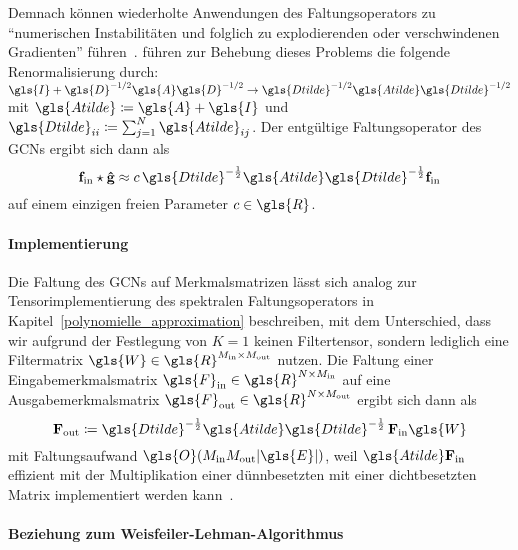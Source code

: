 Demnach können wiederholte Anwendungen des Faltungsoperators zu \enquote{numerischen Instabilitäten und folglich zu explodierenden oder verschwindenen Gradienten} führen~\cite{gcn}.
\citeauthor{gcn} führen zur Behebung dieses Problems die folgende Renormalisierung durch: $\gls{I} + \gls{D}^{-1/2} \gls{A} \gls{D}^{-1/2} \rightarrow \gls{Dtilde}^{-1/2} \gls{Atilde} \gls{Dtilde}^{-1/2}$ mit $\gls{Atilde} \coloneqq \gls{A} + \gls{I}$ und $\gls{Dtilde}_{ii} \coloneqq \sum_{j=1}^N \gls{Atilde}_{ij}$.
Der entgültige Faltungsoperator des \glspl{GCN} ergibt sich dann als
\begin{equation}
  \ve{f}_{\mathrm{in}} \star \ve{\hat g} \approx c\, \gls{Dtilde}^{-\frac{1}{2}} \gls{Atilde} \gls{Dtilde}^{-\frac{1}{2}} \ve{f}_{\mathrm{in}}
  \label{eq:gcn_renorm}
\end{equation}
auf einem einzigen freien Parameter $c \in \gls{R}$.

\paragraph{Implementierung}
\label{gcn_tensor}

Die Faltung des \glspl{GCN} auf Merkmalsmatrizen lässt sich analog zur Tensorimplementierung des spektralen Faltungsoperators in Kapitel~\ref{polynomielle_approximation} beschreiben, mit dem Unterschied, dass wir aufgrund der Festlegung von $K=1$ keinen Filtertensor, sondern lediglich eine Filtermatrix $\gls{W} \in \gls{R}^{M_{\mathrm{in}} \times M_{\mathrm{out}}}$ nutzen.
Die Faltung einer Eingabemerkmalsmatrix $\gls{F}_{\mathrm{in}} \in \gls{R}^{N \times M_{\mathrm{in}}}$ auf eine Ausgabemerkmalsmatrix $\gls{F}_{\mathrm{out}} \in \gls{R}^{N \times M_{\mathrm{out}}}$ ergibt sich dann als
\begin{equation}
  \ma{F}_{\mathrm{out}} \coloneqq \gls{Dtilde}^{-\frac{1}{2}} \gls{Atilde} \gls{Dtilde}^{-\frac{1}{2}}\, \ma{F}_{\mathrm{in}} \gls{W}
  \label{eq:gcn_tensor}
\end{equation}
mit Faltungsaufwand $\gls{O}\left(M_{\mathrm{in}}M_{\mathrm{out}}\left|\gls{E}\right|\right)$, weil $\gls{Atilde}\ma{F}_{\mathrm{in}}$ effizient mit der Multiplikation einer dünnbesetzten mit einer dichtbesetzten Matrix implementiert werden kann~\cite{gcn}.

\paragraph{Beziehung zum Weisfeiler-Lehman-Algorithmus}
\label{weisfeiler_lehman_beziehung}

